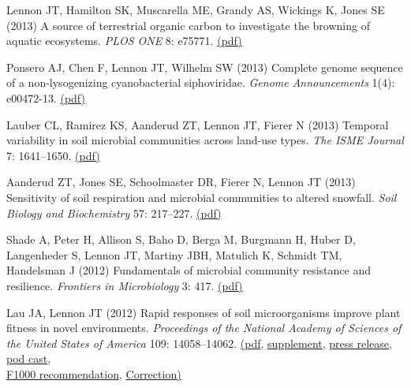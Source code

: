 \documentclass[11pt]{article}
\begin{document}
\begin{etaremune}
\item Lennon JT, Hamilton SK, Muscarella ME, Grandy AS, Wickings K, Jones SE (2013) A source of terrestrial organic carbon to investigate the browning of aquatic ecosystems. \textit{PLOS ONE} 8: e75771. \href{https://lennonlab.github.io/assets/publications/Lennon_etal_2013.pdf}{(pdf)}

\item Ponsero AJ, Chen F, Lennon JT, Wilhelm SW (2013) Complete genome sequence of a non-lysogenizing cyanobacterial siphoviridae. \textit{Genome Announcements} 1(4): e00472-13. \href{https://lennonlab.github.io/assets/publications/Ponsero_etal_2013.pdf}{(pdf)}

\item Lauber CL, Ramirez KS, Aanderud ZT, Lennon JT, Fierer N (2013) Temporal variability in soil microbial communities across land-use types. \textit{The ISME Journal} 7: 1641–1650. \href{https://lennonlab.github.io/assets/publications/Lauber_etal_2013.pdf}{(pdf)}

\item Aanderud ZT, Jones SE, Schoolmaster DR, Fierer N, Lennon JT (2013) Sensitivity of soil respiration and microbial communities to altered snowfall. \textit{Soil Biology and Biochemistry} 57: 217–227. \href{https://lennonlab.github.io/assets/publications/Aanderud_etal_2013.pdf}{(pdf)}

\item Shade A, Peter H, Allison S, Baho D, Berga M, Burgmann H, Huber D, Langenheder S, Lennon JT, Martiny JBH, Matulich K, Schmidt TM, Handelsman J (2012) Fundamentals of microbial community resistance and resilience. \textit{Frontiers in Microbiology} 3: 417. \href{https://lennonlab.github.io/assets/publications/Shade_etal_2012.pdf}{(pdf)}

\item Lau JA, Lennon JT (2012) Rapid responses of soil microorganisms improve plant fitness in novel environments. \textit{Proceedings of the National Academy of Sciences of the United States of America} 109: 14058–14062. \href{https://lennonlab.github.io/assets/publications/Lau_Lennon_2012.pdf}{(pdf}, \href{https://lennonlab.github.io/assets/publications/Lau_Lennon_2012_Suppl.pdf}{supplement}, \href{https://www.sciencedaily.com/releases/2012/08/120814110957.htm}{press release}, \href{http://www.bacteriofiles.com/2012/09/bacteriofiles-micro-edition-103.html}{pod cast}, \\ \href{https://f1000.com/prime/717978110}{F1000 recommendation}, \href{https://www.pnas.org/doi/10.1073/pnas.2118690118}{Correction)}


\end{etaremune}
\end{document}
